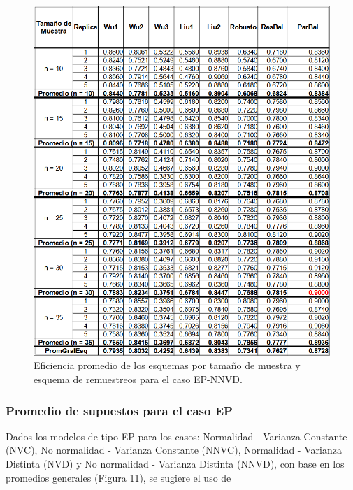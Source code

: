 \begin{figure}[ht] 
	\centering 
	\includegraphics[width=0.70\linewidth]{img/EP_NNVD_Efic_Esq.png} 
	\caption{Eficiencia promedio de los esquemas por tamaño de muestra y esquema de remuestreos para el caso EP-NNVD.} 
	\label{fig:EP_NNVD_Esq}
\end{figure}
\FloatBarrier



\subsubsection{Promedio de supuestos para el caso EP}
Dados los modelos de tipo EP para los casos: Normalidad - Varianza Constante (NVC), No normalidad - Varianza Constante (NNVC), Normalidad - Varianza Distinta (NVD) y  No normalidad - Varianza Distinta (NNVD), con base en los promedios generales (Figura 11), se sugiere el uso de 




